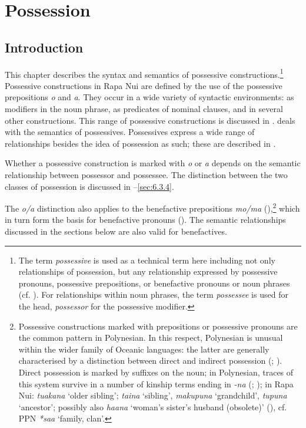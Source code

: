 \chapter[Possession]{Possession}\label{ch:6}
\section{Introduction}\label{sec:6.1}
This chapter describes the syntax and semantics of possessive constructions.\footnote{\label{fn:282}The term \textit{possessive} is used as a technical term here including not only relationships of possession, but any relationship expressed by possessive pronouns, possessive prepositions, or benefactive pronouns or noun phrases (cf. \citealt[94]{Lichtenberk1985}). For relationships within noun phrases, the term \textit{possessee} is used for the head, \textit{possessor} for the possessive modifier.} Possessive constructions in Rapa Nui are defined by the use of the possessive prepositions \textit{o} and \textit{{\ꞌ}a}. They occur in a wide variety of syntactic environments: as modifiers in the noun phrase, as predicates of nominal clauses, and in several other constructions. This range of possessive constructions is discussed in .  deals with the semantics of possessives. Possessives express a wide range of relationships besides the idea of possession as such; these are described in . 

Whether a possessive construction is marked with \textit{o} or \textit{a} depends on the semantic relationship between possessor and possessee. The distinction between the two classes of possession is discussed in –\ref{sec:6.3.4}.

The \textit{o/a} distinction also applies to the benefactive prepositions \textit{mo/ma} (),\footnote{\label{fn:283}Possessive constructions marked with prepositions or possessive pronouns are the common pattern in Polynesian. In this respect, Polynesian is unusual within the wider family of Oceanic languages: the latter are generally characterised by a distinction between direct and indirect possession (\citealt{Lynch1997}; \citealt{Lichtenberk1985}). Direct possession is marked by suffixes on the noun; in Polynesian, traces of this system survive in a number of kinship terms ending in \textit{-na} (\citealt{Lynch1997}; \citealt{Marck1996Kin}); in Rapa Nui: \textit{tuakana} ‘older sibling’; \textit{taina} ‘sibling’, \textit{makupuna} ‘grandchild’, \textit{tupuna} ‘ancestor’; possibly also \textit{ha{\ꞌ}ana} ‘woman’s sister’s husband (obsolete)’ (\citealt[99]{Métraux1971}), cf. PPN \textit{*sa{\ꞌ}a} ‘family, clan’.} which in turn form the basis for benefactive pronouns (). The semantic relationships discussed in the sections below are also valid for benefactives.

